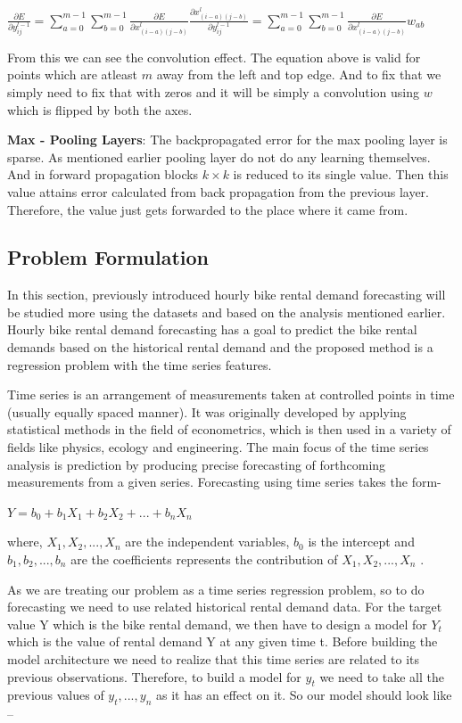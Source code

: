 $\frac{\partial E}{\partial y_{ij}^{l-1}} = \sum_{a=0}^{m-1} \sum_{b=0}^{m-1} \frac{\partial E}{\partial x_{(i-a)(j-b)}^l} \frac{\partial x_{(i-a)(j-b)}^l}{\partial y_{ij}^{l-1}} = \sum_{a=0}^{m-1} \sum_{b=0}^{m-1} \frac{\partial E}{\partial x_{(i-a)(j-b)}^l} w_{ab}$

From this we can see the convolution effect. The equation above is valid for points which are atleast $m$ away from the left and top edge. And to fix that we simply need to fix that with zeros and it will be simply a convolution using $w$ which is flipped by both the axes. 


\textbf {Max - Pooling Layers}:
The backpropagated error for the max pooling layer is sparse. As mentioned earlier pooling layer do not do any learning themselves. And in forward propagation blocks $k \times k$ is reduced to its single value. Then this value attains error calculated from back propagation from the previous layer. Therefore, the value just gets forwarded to the place where it came from.


\subsection{Problem Formulation}
\label{Problem}

In this section, previously introduced hourly bike rental demand forecasting will be studied more using the datasets and based on the analysis mentioned earlier. Hourly bike rental demand forecasting has a goal to predict the bike rental demands based on the historical rental demand and the proposed method is a regression problem with the time series features. 


Time series is an arrangement of measurements taken at controlled points in time (usually equally spaced manner). It was originally developed by applying statistical methods in the field of econometrics, which is then used in a variety of fields like physics, ecology and engineering. The main focus of the time series analysis is prediction by producing precise forecasting of forthcoming measurements from a given series. Forecasting using time series takes the form-

$Y= b_0 + b_1 X_1+b_2 X_2+...+b_n X_n$

where, $X_1,X_2,... ,X_n$ are the independent variables, $b_0$ is the intercept and $b_1,b_2,... ,b_n$ are the coefficients represents the contribution of $X_1,X_2,... ,X_n$ .

As we are treating our problem as a time series regression problem, so to do forecasting we need to use related historical rental demand data. For the target value Y which is the bike rental demand, we then have to design a model for $Y_t$ which is the value of rental demand Y at any given time t. Before building the model architecture we need to realize that this time series are related to its previous observations. Therefore, to build a model for $y_t$ we need to take all the previous values of $y_t,. . .,y_n$ as it has an effect on it. So our model should look like – 

